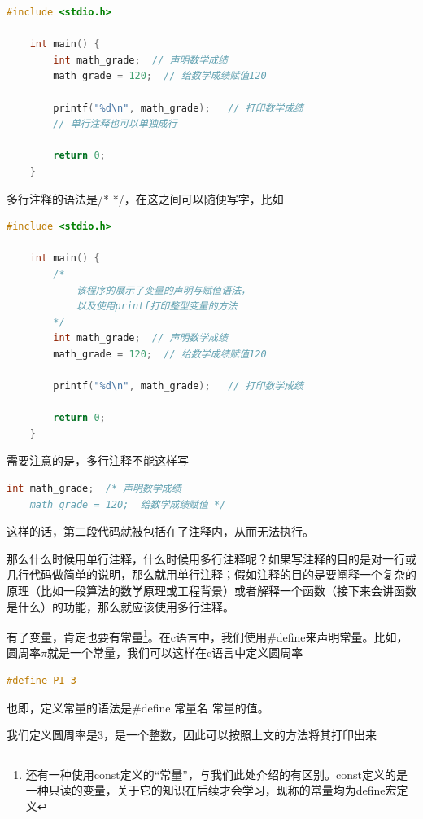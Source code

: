 \begin{lstlisting}[language=C]
    #include <stdio.h>

    int main() {
        int math_grade;  // 声明数学成绩
        math_grade = 120;  // 给数学成绩赋值120

        printf("%d\n", math_grade);   // 打印数学成绩
        // 单行注释也可以单独成行

        return 0;
    }
\end{lstlisting}

多行注释的语法是/* */，在这之间可以随便写字，比如

\begin{lstlisting}[language=C]
    #include <stdio.h>

    int main() {
        /*
            该程序的展示了变量的声明与赋值语法，
            以及使用printf打印整型变量的方法
        */
        int math_grade;  // 声明数学成绩
        math_grade = 120;  // 给数学成绩赋值120

        printf("%d\n", math_grade);   // 打印数学成绩

        return 0;
    }
\end{lstlisting}

需要注意的是，多行注释不能这样写

\begin{lstlisting}[language=C]
    int math_grade;  /* 声明数学成绩 
    math_grade = 120;  给数学成绩赋值 */
\end{lstlisting}

这样的话，第二段代码就被包括在了注释内，从而无法执行。

那么什么时候用单行注释，什么时候用多行注释呢？如果写注释的目的是对一行或几行代码做简单的说明，那么就用单行注释；假如注释的目的是要阐释一个复杂的原理（比如一段算法的数学原理或工程背景）或者解释一个函数（接下来会讲函数是什么）的功能，那么就应该使用多行注释。

有了变量，肯定也要有常量\footnote{还有一种使用const定义的“常量”，与我们此处介绍的有区别。const定义的是一种只读的变量，关于它的知识在后续才会学习，现称的常量均为define宏定义}。在c语言中，我们使用\#define来声明常量。比如，圆周率$\pi$就是一个常量，我们可以这样在c语言中定义圆周率

\begin{lstlisting}[language=C]
    #define PI 3 
\end{lstlisting}

也即，定义常量的语法是\#define 常量名 常量的值。

我们定义圆周率是3，是一个整数，因此可以按照上文的方法将其打印出来

